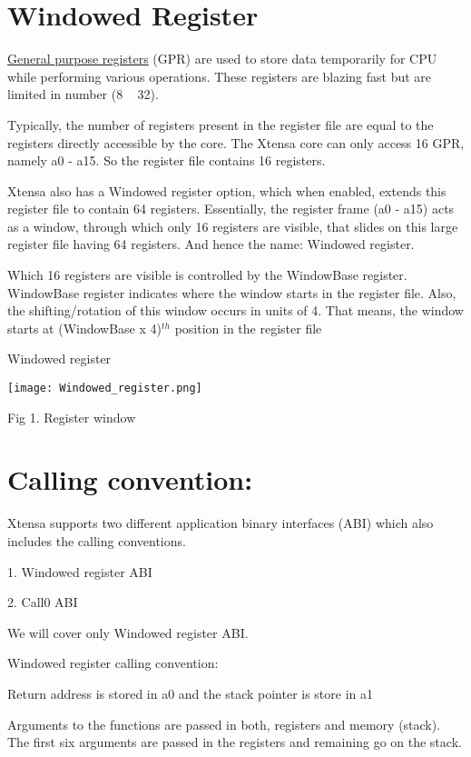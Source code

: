 \section{Windowed Register}

\underline{General purpose registers} (GPR) are used to store data temporarily for CPU while performing various operations. These registers are blazing fast but are limited in number (8 ~ 32).

Typically, the number of registers present in the register file are equal to the registers directly accessible by the core. The Xtensa core can only access 16 GPR, namely a0 - a15. So the register file contains 16 registers.

Xtensa also has a Windowed register option, which when enabled, extends this register file to contain 64 registers. Essentially, the register frame (a0 - a15) acts as a window, through which only 16 registers are visible, that slides on this large register file having 64 registers. And hence the name: Windowed register.

Which 16 registers are visible is controlled by the WindowBase register. WindowBase register indicates where the window starts in the register file. Also, the shifting/rotation of this window occurs in units of 4. That means, the window starts at (WindowBase x 4)$^{th}$ position in the register file

Windowed register


\texttt{[image: Windowed\_register.png]}

Fig 1. Register window

\section*{Calling convention:}

 Xtensa supports two different application binary interfaces (ABI) which also includes the calling conventions.
 
1. Windowed register ABI

2. Call0 ABI

We will cover only Windowed register ABI.

Windowed register calling convention:

Return address is stored in a0 and the stack pointer is store in a1

Arguments to the functions are passed in both, registers and memory (stack). The first six arguments are passed in the registers and remaining go on the stack.

